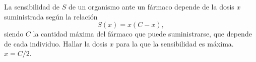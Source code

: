 {La sensibilidad de $S$ de un organismo ante un fármaco depende de la dosis $x$ suministrada según la relación
\[
S(x) = x(C-x),
\]
siendo $C$ la cantidad máxima del fármaco que puede suministrarse, que depende de cada individuo.
Hallar la dosis $x$ para la que la sensibilidad es máxima.
}
{$x=C/2$.
}
{
}

